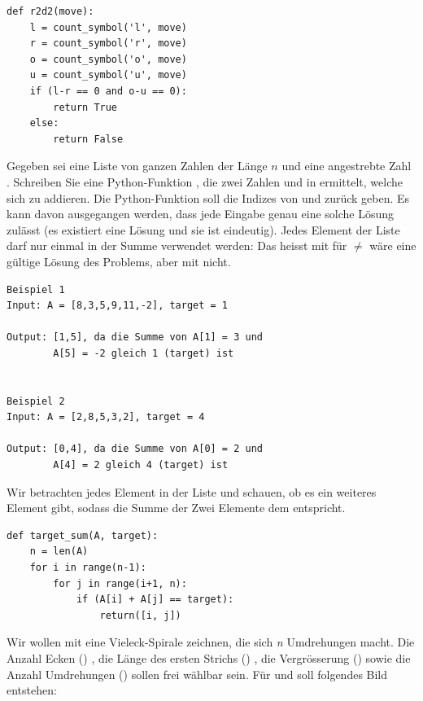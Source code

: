 \begin{questions}
\begin{solution}
\begin{lstlisting}[style=TigerJython]
def r2d2(move):
    l = count_symbol('l', move)
    r = count_symbol('r', move)
    o = count_symbol('o', move)
    u = count_symbol('u', move)
    if (l-r == 0 and o-u == 0):
        return True
    else:
        return False
\end{lstlisting}
\end{solution}

\clearpage
{}

Gegeben sei eine Liste  von ganzen Zahlen der Länge $n$ und eine angestrebte Zahl \mbox{.} Schreiben Sie eine Python-Funktion , die zwei Zahlen  und  in  ermittelt, welche sich zu  addieren. Die Python-Funktion soll die Indizes von  und  zurück geben. Es kann davon ausgegangen werden, dass jede Eingabe genau eine solche Lösung zulässt (es existiert eine Lösung und sie ist eindeutig). Jedes Element der Liste darf nur einmal in der Summe verwendet werden: Das heisst \tjinline{[i,j]} mit  für  $\neq$  wäre eine gültige Lösung des Problems, aber \tjinline{[i,i]} mit  nicht.
\begin{lstlisting}[numbers=none,framexleftmargin=0em,xleftmargin=0em]
Beispiel 1
Input: A = [8,3,5,9,11,-2], target = 1

Output: [1,5], da die Summe von A[1] = 3 und
        A[5] = -2 gleich 1 (target) ist


Beispiel 2
Input: A = [2,8,5,3,2], target = 4

Output: [0,4], da die Summe von A[0] = 2 und
        A[4] = 2 gleich 4 (target) ist
\end{lstlisting}


\begin{solution}
Wir betrachten jedes Element in der Liste und schauen, ob es ein weiteres Element gibt, sodass die Summe der Zwei Elemente dem  entspricht.
\begin{lstlisting}[style=TigerJython]
def target_sum(A, target):
    n = len(A)
    for i in range(n-1):
        for j in range(i+1, n):
            if (A[i] + A[j] == target):
                return([i, j])
\end{lstlisting}
\end{solution}

\clearpage
{}
Wir wollen mit  eine Vieleck-Spirale zeichnen, die sich \textit{n} Umdrehungen macht. Die Anzahl Ecken () , die Länge des ersten Strichs () , die Vergrösserung () sowie die Anzahl Umdrehungen () sollen frei wählbar sein. Für  und  soll folgendes Bild entstehen:


\end{questions}
